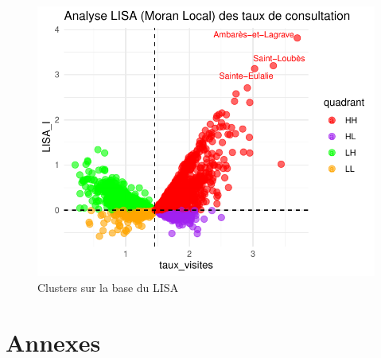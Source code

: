 \documentclass[
]{article}
\begin{document}
\begin{figure}

{\centering \includegraphics{rapport_intermediaire_files/figure-latex/unnamed-chunk-33-1} 

}

\caption{Clusters sur la base du LISA}\label{fig:unnamed-chunk-33}
\end{figure}

\hypertarget{annexes}{%
\section{Annexes}\label{annexes}}
\end{document}
